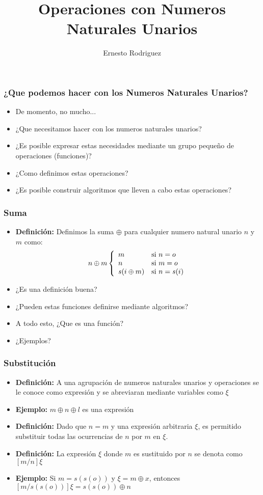 \documentclass{beamer}
\title[Operaciones]{Operaciones con Numeros Naturales Unarios}
\author{Ernesto Rodriguez}
\institute{
    Universidad del Itsmo \\
    \medskip \textit{erodriguez@unis.edu.gt}
}
\date[\today]{}
\begin{document}
\begin{frame}
\titlepage
\end{frame}

\begin{frame}
    \frametitle{¿Que podemos hacer con los Numeros Naturales Unarios?}
    \begin{itemize}
        \item{De momento, no mucho...}
        \item{¿Que necesitamos hacer con los numeros naturales unarios?}
        \item{¿Es posible expresar estas necesidades mediante un grupo
        peque\~no de operaciones (funciones)?}
        \item{¿Como definimos estas operaciones?}
        \item{¿Es posible construir algoritmos que lleven a cabo estas operaciones?}
    \end{itemize}
\end{frame}

\begin{frame}
\frametitle{Suma}
\begin{itemize}
    \item{{\bf Definici\'on: }Definimos la suma $\oplus$ para cualquier numero
    natural unario $n$ y $m$ como:
    \[
        n\oplus m \left\{
        \begin{array}{l l}
            m & \mbox{si } n=o \\
            n & \mbox{si } m=o \\
            s(i\oplus m) & \mbox{si } n=s(i) \\
        \end{array}
        \right.
    \]
    }
    \item{¿Es una definici\'on buena?}
    \item{¿Pueden estas funciones definirse mediante algoritmos?}
    \item{A todo esto, ¿Que es una funci\'on?}
    \item{¿Ejemplos?}
\end{itemize}
\end{frame}

\begin{frame}
\frametitle{Substituci\'on}
\begin{itemize}
    \item{{\bf Definici\'on: }A una agrupaci\'on de numeros naturales unarios y
    operaciones se le conoce como expresi\'on y se abreviaran mediante variables como $\xi$}
    \item{{\bf Ejemplo: }$m\oplus n \oplus l$ es una expresi\'on}
    \item{{\bf Definici\'on: }Dado que $n=m$ y una expresi\'on arbitraria $\xi$,
    es permitido substituir todas las ocurrencias de $n$ por $m$ en $\xi$.}
    \item{{\bf Definici\'on: }La expresi\'on $\xi$ donde $m$ es sustituido por $n$
    se denota como $[m \slash n]\xi$}
    \item{{\bf Ejemplo: }Si $m=s(s(o))$ y $\xi=m\oplus x$, entonces $[m \slash s(s(o))]\xi=s(s(o))\oplus n$}
\end{itemize}
\end{frame}
\end{document}
